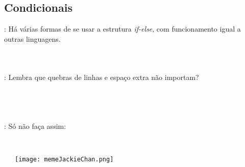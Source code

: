 \subsection{Condicionais}


\begin{frame}{\insertsection: \insertsubsection}
  Há várias formas de se usar a estrutura \textit{if-else}, com funcionamento igual a outras linguagens.
  \begin{columns}[t]
    \inputminted[firstline=1,lastline=3]{arduino}{sketches/introLinguagem/.condicionais.ino}
    \inputminted[firstline=1,lastline=6]{arduino}{sketches/introLinguagem/.condicionais.ino}
    \inputminted[firstline=8,lastline=16]{arduino}{sketches/introLinguagem/.condicionais.ino}
  \end{columns}
\end{frame}


\begin{frame}{\insertsection: \insertsubsection}
  Lembra que quebras de linhas e espaço extra não importam?
  \begin{columns}[t]
    \inputminted[firstline=1,lastline=6]{arduino}{sketches/introLinguagem/.condicionais.ino}\vspace{-\bigskipamount}\\
    \inputminted[firstline=18,lastline=22]{arduino}{sketches/introLinguagem/.condicionais.ino}
    \inputminted[firstline=24,lastline=31]{arduino}{sketches/introLinguagem/.condicionais.ino}
    \inputminted[firstline=33,lastline=39]{arduino}{sketches/introLinguagem/.condicionais.ino}
  \end{columns}
\end{frame}


\begin{frame}{\insertsection: \insertsubsection}
  Só não faça assim:
  \begin{columns}[t]
    \inputminted[firstline=41,lastline=41]{arduino}{sketches/introLinguagem/.condicionais.ino}\\
    \texttt{[image: memeJackieChan.png]}
    \inputminted[firstline=43,lastline=52]{arduino}{sketches/introLinguagem/.condicionais.ino}
  \end{columns}
\end{frame}


